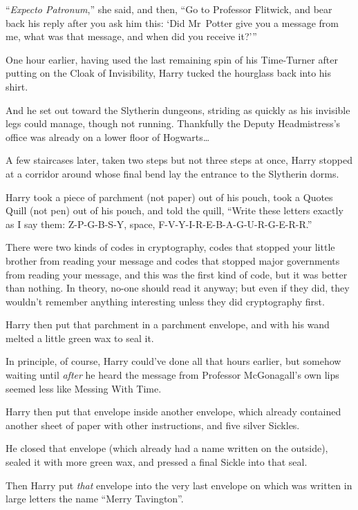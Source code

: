 “\emph{Expecto Patronum},” she said, and then, “Go to Professor Flitwick, and bear back his reply after you ask him this: ‘Did Mr~Potter give you a message from me, what was that message, and when did you receive it?’”

\later

One hour earlier, having used the last remaining spin of his Time-Turner after putting on the Cloak of Invisibility, Harry tucked the hourglass back into his shirt.

And he set out toward the Slytherin dungeons, striding as quickly as his invisible legs could manage, though not running. Thankfully the Deputy Headmistress’s office was already on a lower floor of Hogwarts…

A few staircases later, taken two steps but not three steps at once, Harry stopped at a corridor around whose final bend lay the entrance to the Slytherin dorms.

Harry took a piece of parchment (not paper) out of his pouch, took a Quotes Quill (not pen) out of his pouch, and told the quill, “Write these letters exactly as I say them: Z-P-G-B-S-Y, space, F-V-Y-I-R-E-B-A-G-U-R-G-E-R-R.”

There were two kinds of codes in cryptography, codes that stopped your little brother from reading your message and codes that stopped major governments from reading your message, and this was the first kind of code, but it was better than nothing. In theory, no-one should read it anyway; but even if they did, they wouldn’t remember anything interesting unless they did cryptography first.

Harry then put that parchment in a parchment envelope, and with his wand melted a little green wax to seal it.

In principle, of course, Harry could’ve done all that hours earlier, but somehow waiting until \emph{after} he heard the message from Professor McGonagall’s own lips seemed less like Messing With Time.

Harry then put that envelope inside another envelope, which already contained another sheet of paper with other instructions, and five silver Sickles.

He closed that envelope (which already had a name written on the outside), sealed it with more green wax, and pressed a final Sickle into that seal.

Then Harry put \emph{that} envelope into the very last envelope on which was written in large letters the name “Merry Tavington”.


